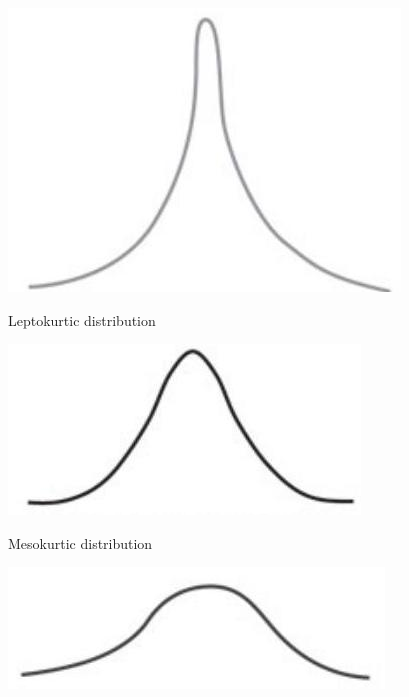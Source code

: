 \documentclass[11pt]{article}
\begin{document}
\begin{center}
\includegraphics[max width=\textwidth]{2024_04_10_817da4f390bf5301abf8g-4}
\end{center}

Leptokurtic distribution

\begin{center}
\includegraphics[max width=\textwidth]{2024_04_10_817da4f390bf5301abf8g-4(1)}
\end{center}

Mesokurtic distribution

\begin{center}
\includegraphics[max width=\textwidth]{2024_04_10_817da4f390bf5301abf8g-4(2)}
\end{center}
\end{document}
